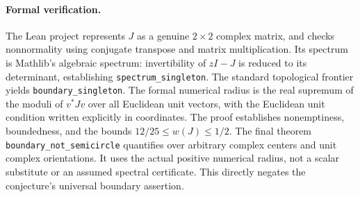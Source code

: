 \documentclass[11pt]{article}
\begin{document}
\paragraph{Formal verification.}
The Lean project represents $J$ as a genuine $2\times2$ complex matrix,
and checks nonnormality using conjugate transpose and matrix multiplication.
Its spectrum is Mathlib's algebraic spectrum: invertibility of $zI-J$ is
reduced to its determinant, establishing \texttt{spectrum\_singleton}.
The standard topological frontier yields \texttt{boundary\_singleton}.
The formal numerical radius is the real supremum of the moduli of
$v^*Jv$ over all Euclidean unit vectors, with the Euclidean unit condition
written explicitly in coordinates. The proof establishes nonemptiness,
boundedness, and the bounds $12/25\leq w(J)\leq1/2$.
The final theorem \texttt{boundary\_not\_semicircle} quantifies over arbitrary
complex centers and unit complex orientations. It uses the actual
positive numerical radius, not a scalar substitute or an assumed
spectral certificate. This directly negates the conjecture's universal
boundary assertion.
\end{document}
